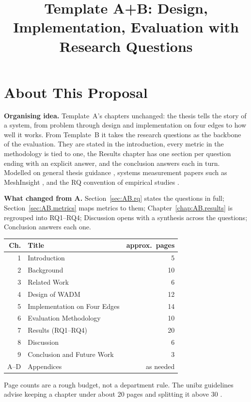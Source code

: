 \documentclass{rptuma}
\title{Template A+B: Design, Implementation, Evaluation with Research Questions}
\begin{document}
\maketitle
{}
\setcounter{page}{1}

\chapter*{About This Proposal}

\textbf{Organising idea.} Template~A's chapters unchanged: the thesis tells the story of a
system, from problem through design and implementation on four edges to how well it works. From
Template~B it takes the research questions as the backbone of the evaluation. They are stated in
the introduction, every metric in the methodology is tied to one, the Results chapter has one
section per question ending with an explicit answer, and the conclusion answers each in turn.
Modelled on general thesis guidance \cite{intille_thesis,unibz_guidelines}, systems measurement
papers such as MeshInsight \cite{zhu2022dissecting}, and the RQ convention of empirical studies
\cite{wohlin2012experimentation}.

\textbf{What changed from A.} Section~\ref{sec:AB.rq} states the questions in full;
Section~\ref{sec:AB.metrics} maps metrics to them; Chapter~\ref{chap:AB.results} is regrouped into
RQ1--RQ4; Discussion opens with a synthesis across the questions; Conclusion answers each one.

\begin{center}
\small
\begin{tabularx}{\textwidth}{@{}rXr@{}}
\toprule
Ch. & Title & approx.\ pages \\
\midrule
1 & Introduction & 5 \\
2 & Background & 10 \\
3 & Related Work & 6 \\
4 & Design of WADM & 12 \\
5 & Implementation on Four Edges & 14 \\
6 & Evaluation Methodology & 10 \\
7 & Results (RQ1--RQ4) & 20 \\
8 & Discussion & 6 \\
9 & Conclusion and Future Work & 3 \\
A--D & Appendices & as needed \\
\bottomrule
\end{tabularx}
\end{center}
{\footnotesize Page counts are a rough budget, not a department rule. The unibz guidelines
advise keeping a chapter under about 20 pages and splitting it above 30 \cite{unibz_guidelines}.}
\end{document}
